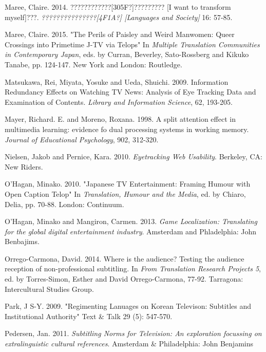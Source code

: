 \documentclass[output=paper]{langsci/langscibook}
\begin{document}
Maree, Claire. 2014. ????????????[305F?]????????? [I want to transform myself]???. \textit{???????????????[4F1A?] [Languages and Society]} 16: 57-85.



Maree, Claire. 2015. "The Perils of Paisley and Weird Manwomen: Queer Crossings into Primetime J-TV via Telops" In \textit{Multiple Translation Communities in Contemporary Japan}, eds. by Curran, Beverley, Sato-Rossberg and Kikuko Tanabe, pp. 124-147. New York and London: Routledge.



Matsukawa, Rei, Miyata, Yosuke and Ueda, Shuichi. 2009. Information Redundancy Effects on Watching TV News: Analysis of Eye Tracking Data and Examination of Contents. \textit{Library and Information Science}, 62, 193-205. 



Mayer, Richard. E. and Moreno, Roxana. 1998. A split attention effect in multimedia learning: evidence fo dual processing systems in working memory. \textit{Journal of Educational Psychology}, 902, 312-320.



Nielsen, Jakob and Pernice, Kara. 2010. \textit{Eyetracking Web Usability}. Berkeley, CA: New Riders.



O'Hagan, Minako. 2010. "Japanese TV Entertainment: Framing Humour with Open Caption Telop" In \textit{Translation, Humour and the Media}, ed. by Chiaro, Delia, pp. 70-88. London: Continuum.



O'Hagan, Minako and Mangiron, Carmen. 2013. \textit{Game Localization: Translating for the global digital entertainment industry}. Amsterdam and Phladelphia: John Benbajims.  



Orrego-Carmona, David. 2014. Where is the audience? Testing the audience reception of non-professional subtitling. In \textit{From Translation Research Projects 5}, ed. by Torres-Simon, Esther and David Orrego-Carmona, 77-92. Tarragona: Intercultural Studies Group.



Park, J S-Y. 2009. "Regimenting Lanuages on Korean Televison: Subtitles and Institutional Authority" Text \& Talk 29 (5): 547-570. 



Pedersen, Jan. 2011. \textit{Subtitling Norms for Television: An exploration focussing on extralinguistic cultural references}. Amsterdam \& Philadelphia: John Benjamins
\end{document}
